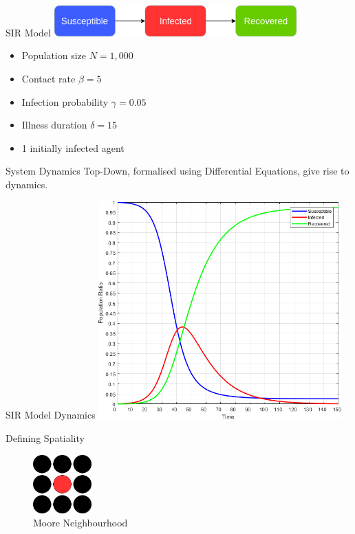 \documentclass{beamer} %
\begin{document}
\begin{frame}{SIR Model}
  \includegraphics[width=0.7\textwidth]{./fig/SIR_transitions.png}
  
  \begin{itemize}
    \item Population size $N = 1,000$
 	\item Contact rate $\beta = 5$
 	\item Infection probability $\gamma = 0.05$
 	\item Illness duration $\delta = 15$
 	\item 1 initially infected agent
  \end{itemize}
    
  \begin{block}{System Dynamics}
    Top-Down, formalised using Differential Equations, give rise to dynamics.
  \end{block}
\end{frame}

\begin{frame}{SIR Model Dynamics}
  \center
  \includegraphics[width=0.7\textwidth]{./fig/SIR_SD_001dt.png}
\end{frame}

\begin{frame}[fragile]{Defining Spatiality}
\begin{figure}
\begin{center}
\includegraphics[width=0.2\textwidth]{./fig/moore.png}
\caption*{Moore Neighbourhood}
\end{center}
\end{figure}
\end{frame}
\end{document}
